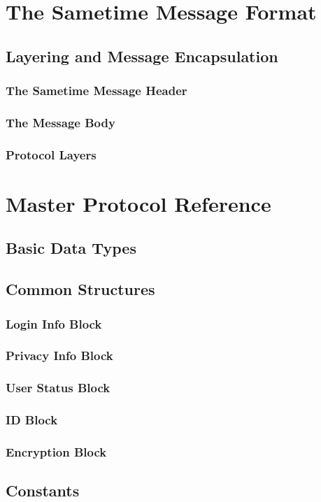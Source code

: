 \documentclass[titlepage,oneside]{book}
\begin{document}
\chapter{The Sametime Message Format}
\section{Layering and Message Encapsulation}
\subsection{The Sametime Message Header}
\subsection{The Message Body}
\subsection{Protocol Layers}

\chapter{Master Protocol Reference}
\section{Basic Data Types}
\section{Common Structures}
\subsection{Login Info Block}
\subsection{Privacy Info Block}
\subsection{User Status Block}
\subsection{ID Block}
\subsection{Encryption Block}

\section{Constants}
\end{document}
